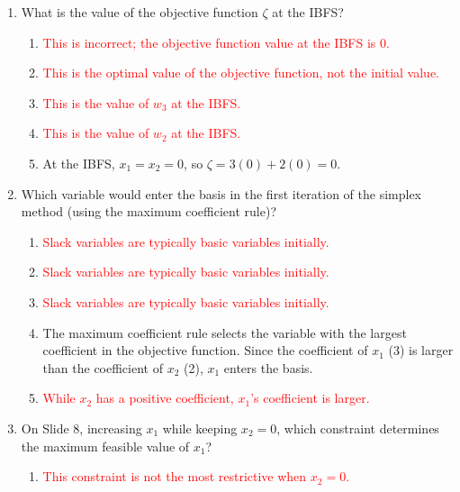 \documentclass{article}%
\newcommand{\incorrect}[1]{\textcolor{red}{#1}}
\begin{document}
\begin{enumerate}
\begin{enumerate}
\begin{enumerate}
\item \incorrect{This is the value of $w_3$ in the IBFS, not $w_2$.}%
\item \incorrect{This is not the value of any of the slack variables in the IBFS.}%
\end{enumerate}%
\vspace{0.5em}%
\item What is the value of the objective function $\zeta$ at the IBFS?%
\begin{enumerate}%
\item \incorrect{This is incorrect; the objective function value at the IBFS is 0.}%
\item \incorrect{This is the optimal value of the objective function, not the initial value.}%
\item \incorrect{This is the value of $w_3$ at the IBFS.}%
\item \incorrect{This is the value of $w_2$ at the IBFS.}%
\item At the IBFS, $x_1 = x_2 = 0$, so $\zeta = 3(0) + 2(0) = 0$.%
\end{enumerate}%
\vspace{0.5em}%
\item Which variable would enter the basis in the first iteration of the simplex method (using the maximum coefficient rule)?%
\begin{enumerate}%
\item \incorrect{Slack variables are typically basic variables initially.}%
\item \incorrect{Slack variables are typically basic variables initially.}%
\item \incorrect{Slack variables are typically basic variables initially.}%
\item The maximum coefficient rule selects the variable with the largest coefficient in the objective function.  Since the coefficient of $x_1$ (3) is larger than the coefficient of $x_2$ (2), $x_1$ enters the basis.%
\item \incorrect{While $x_2$ has a positive coefficient, $x_1$'s coefficient is larger.}%
\end{enumerate}%
\vspace{0.5em}%
\item On Slide 8, increasing $x_1$ while keeping $x_2 = 0$, which constraint determines the maximum feasible value of $x_1$?%
\begin{enumerate}%
\item \incorrect{This constraint is not the most restrictive when $x_2 = 0$.}%

\end{enumerate}
\end{enumerate}
\end{enumerate}
\end{document}
